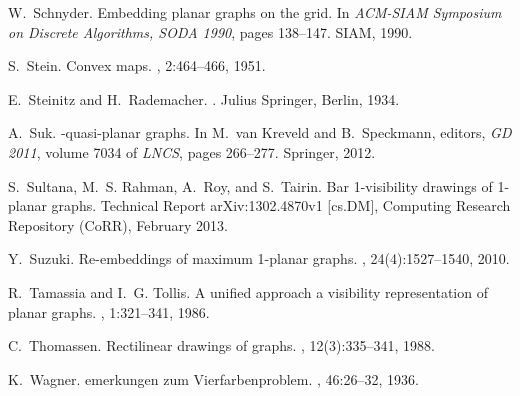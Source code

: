 \documentclass[runningheads]{llncs}
\begin{document}
\begin{thebibliography}{10}
W.~Schnyder.
\newblock Embedding planar graphs on the grid.
\newblock In {\em {ACM-SIAM} Symposium on Discrete Algorithms, {SODA} 1990},
  pages 138--147. {SIAM}, 1990.

S.~Stein.
\newblock Convex maps.
, 2:464--466, 1951.

E.~Steinitz and H.~Rademacher.
.
\newblock Julius Springer, Berlin, 1934.

A.~Suk.
\newblock -quasi-planar graphs.
\newblock In M.~van Kreveld and B.~Speckmann, editors, {\em {GD} 2011}, volume
  7034 of {\em {LNCS}}, pages 266--277. Springer, 2012.

S.~Sultana, M.~S. Rahman, A.~Roy, and S.~Tairin.
\newblock Bar 1-visibility drawings of 1-planar graphs.
\newblock Technical Report arXiv:1302.4870v1 [cs.DM], Computing Research
  Repository (CoRR), February 2013.

Y.~Suzuki.
\newblock Re-embeddings of maximum 1-planar graphs.
, 24(4):1527--1540, 2010.

R.~Tamassia and I.~G. Tollis.
\newblock A unified approach a visibility representation of planar graphs.
, 1:321--341, 1986.

C.~Thomassen.
\newblock Rectilinear drawings of graphs.
, 12(3):335--341, 1988.

K.~Wagner.
emerkungen zum {V}ierfarbenproblem.
, 46:26--32,
  1936.

\end{thebibliography}
\end{document}
